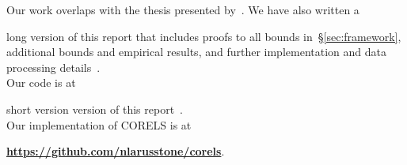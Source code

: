 Our work overlaps with the thesis presented by~\citet{Larus-Stone17}.
%
We have also written a
\begin{kdd}
long version of this report that includes proofs to all
bounds in~\S\ref{sec:framework}, additional bounds and empirical results,
and further implementation and data processing details~\citep{AngelinoLaAlSeRu17}. \\

Our code is at
\end{kdd}
\begin{arxiv}
short version version of this report~\citep{AngelinoLaAlSeRu17-kdd}. \\

Our implementation of CORELS is at
\end{arxiv}
\textbf{\url{https://github.com/nlarusstone/corels}}.

